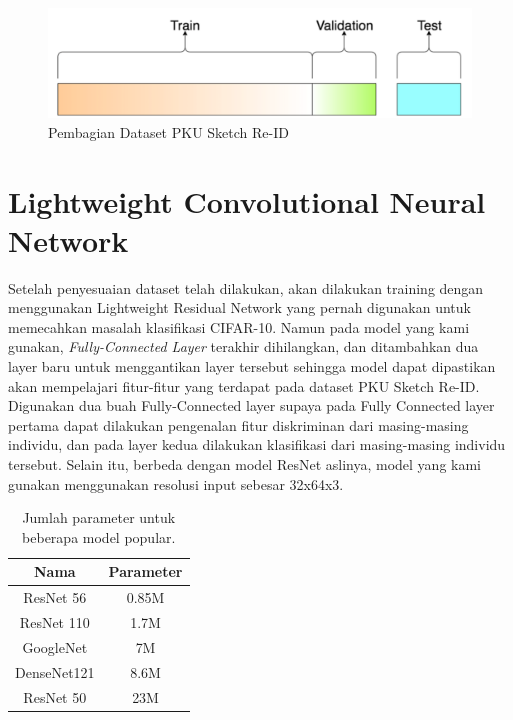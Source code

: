 \begin{figure}  [!htb]
	\includegraphics[scale=0.35]{img/dataset.png}
	\caption{Pembagian Dataset PKU Sketch Re-ID}
	\label{fig: 3_3}
\end{figure}

\section{Lightweight Convolutional Neural Network}
Setelah penyesuaian dataset telah dilakukan, akan dilakukan training dengan menggunakan Lightweight Residual Network yang pernah digunakan untuk memecahkan masalah klasifikasi CIFAR-10. Namun pada model yang kami gunakan, \textit{Fully-Connected Layer} terakhir dihilangkan, dan ditambahkan dua layer baru untuk menggantikan layer tersebut sehingga model dapat dipastikan akan mempelajari fitur-fitur yang terdapat pada dataset PKU Sketch Re-ID. Digunakan dua buah Fully-Connected layer supaya pada Fully Connected layer pertama dapat dilakukan pengenalan fitur diskriminan dari masing-masing individu, dan pada layer kedua dilakukan klasifikasi dari masing-masing individu tersebut. Selain itu, berbeda dengan model ResNet aslinya, model yang kami gunakan menggunakan resolusi input sebesar 32x64x3.

\begin{table}[h!]
	\begin{center}
		\begin{tabular}{|c|c|}
			\hline
			\textbf{Nama} & \textbf{Parameter} \\ \hline
			ResNet 56 & 0.85M \\ \hline
			ResNet 110 & 1.7M \\ \hline
			GoogleNet & 7M \\ \hline
			DenseNet121 & 8.6M \\ \hline
			ResNet 50 & 23M \\ \hline
		\end{tabular}
	\end{center}
	\vspace{1ex}
	\caption{Jumlah parameter untuk beberapa model popular.}
	\label{tabel:2}
\end{table}

